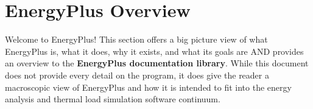 \chapter{EnergyPlus Overview}\label{energyplus-overview}

Welcome to EnergyPlus! This section offers a big picture view of what EnergyPlus is, what it does, why it exists, and what its goals are AND provides an overview to the \textbf{EnergyPlus documentation library}. While this document does not provide every detail on the program, it does give the reader a macroscopic view of EnergyPlus and how it is intended to fit into the energy analysis and thermal load simulation software continuum.
